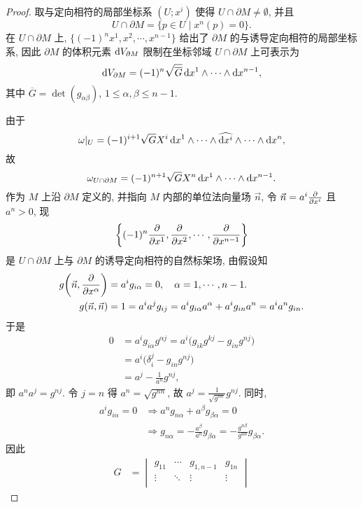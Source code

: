\begin{proof}
  取与定向相符的局部坐标系 $(U;x^i)$ 使得 $U\cap\partial M\neq\emptyset$, 并且
  \[U\cap\partial M = \{p\in U\mid x^n(p)=0\}.\]
  在 $U\cap\partial M$ 上, $\{(-1)^nx^1,x^2,\cdots,x^{n-1}\}$
  给出了 $\partial M$ 的与诱导定向相符的局部坐标系, 因此 $\partial M$
  的体积元素 $\mathop{}\!\mathrm{d} V_{\partial M}$ 限制在坐标邻域 $U\cap\partial M$
  上可表示为
  \[\mathop{}\!\mathrm{d} V_{\partial M} = (-1)^n\sqrt{\overline{G}} \mathop{}\!\mathrm{d} x^1\wedge\cdots\wedge\mathop{}\!\mathrm{d} x^{n-1},\]
  其中 $\overline{G} = \det(g_{\alpha\beta})$, $1\leq\alpha,\beta\leq n-1$.

  由于
  \[\omega|_U = (-1)^{i+1}\sqrt{G}X^i\mathop{}\!\mathrm{d} x^1\wedge\cdots\wedge\widehat{\mathop{}\!\mathrm{d} x^i}
    \wedge\cdots\wedge\mathop{}\!\mathrm{d} x^n,\]
  故
  \[\omega_{U\cap\partial M} = (-1)^{n+1}\sqrt{G}X^n\mathop{}\!\mathrm{d} x^1\wedge\cdots\wedge\mathop{}\!\mathrm{d} x^{n-1}.\]
  作为 $M$ 上沿 $\partial M$ 定义的, 并指向 $M$ 内部的单位法向量场 $\vec{n}$,
  令 $\vec{n}=a^i\pdv{x^i}$ 且 $a^n>0$, 现
  \[\biggl\{(-1)^n\pdv{x^1},\pdv{x^2},\cdots,\pdv{x^{n-1}}\biggr\}\]
  是 $U\cap\partial M$ 上与 $\partial M$ 的诱导定向相符的自然标架场, 由假设知
  \begin{align*}
    g\biggl(\vec{n},\pdv{x^{\alpha}}\biggr) & = a^ig_{i\alpha}=0,\quad \alpha=1,\cdots,n-1. \\
    g(\vec{n},\vec{n}) & = 1 = a^ia^jg_{ij} = a^ig_{i\alpha}a^{\alpha} + a^ig_{in}a^n = a^ia^ng_{in}.
  \end{align*}
  于是
  \begin{align*}
    0
    & = a^ig_{i\alpha}g^{\alpha j} = a^i\bigl(g_{ik}g^{kj}-g_{in}g^{nj}\bigr) \\
    & = a^i\bigl(\delta_i^j-g_{in}g^{nj}\bigr) \\
    & = a^j-\frac{1}{a^n}g^{nj},
  \end{align*}
  即 $a^na^j=g^{nj}$. 令 $j=n$ 得 $a^n=\sqrt{g^{nn}}$, 故 $a^j=\frac{1}{\sqrt{g^{nn}}}g^{nj}$.
  同时,
  \begin{align*}
    a^ig_{i\alpha}=0
    & \Longrightarrow a^ng_{n\alpha} + a^{\beta}g_{\beta\alpha}=0 \\
    & \Longrightarrow g_{n\alpha} = -\frac{a^{\beta}}{a^n}g_{\beta\alpha}
      = -\frac{g^{n\beta}}{g^{nn}}g_{\beta\alpha}.
  \end{align*}
  因此
  \begin{align*}
    G
    & = \begin{vmatrix}
      g_{11}    & \cdots & g_{1,n-1}   & g_{1n}    \\
      \vdots    & \ddots & \vdots      & \vdots    \\

\end{vmatrix}
\end{align*}
\end{proof}
